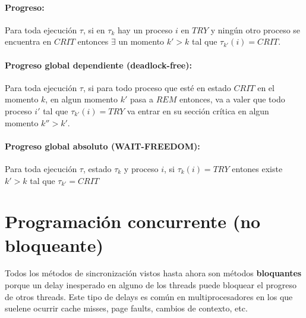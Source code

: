 
\paragraph{Progreso:} Para toda ejecución $\tau$, si en $\tau_k$ hay un proceso $i$ en $TRY$ y ningún otro proceso se encuentra en $CRIT$ entonces $\exists$ un momento $k' > k$ tal que $\tau_{k'}(i) = CRIT$.


\paragraph{Progreso global dependiente (deadlock-free):} Para toda ejecución $\tau$, si para todo proceso que esté en estado $CRIT$ en el momento $k$, en algun momento $k'$ pasa a $REM$ entonces, va a valer que todo proceso $i'$ tal que $\tau_{k'}(i) = TRY$ va entrar en su sección crítica en algun momento $k'' > k'$.


\paragraph{Progreso global absoluto (WAIT-FREEDOM):} Para toda ejecución $\tau$, estado $\tau_{k}$ y proceso $i$, si $\tau_{k}(i) = TRY$ entones existe $k' > k$ tal que $\tau_{k'} = CRIT$

\printbibliography[keyword=sincro,title=Bibliografía]

\newpage
\section{Programación concurrente (no bloqueante)}
Todos los métodos de sincronización vistos hasta ahora son métodos \textbf{bloquantes} porque un delay inesperado en alguno de los threads puede bloquear el progreso de otros threads. Este tipo de delays es común en multiprocesadores en los que suelene ocurrir cache misses, page faults, cambios de contexto, etc.

